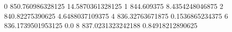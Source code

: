 0 850.760986328125 14.5870361328125
1 844.609375 8.4354248046875
2 840.82275390625 4.6488037109375
4 836.32763671875 0.1536865234375
6 836.1739501953125 0.0
8 837.0231323242188 0.84918212890625
